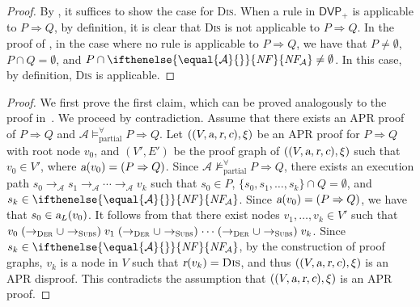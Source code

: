 \documentclass[10pt,a4paper]{article}
\def\cA{\mathcal{A}}
\newcommand{\NF}[1][]{\ifthenelse{\equal{#1}{}}{\mathit{NF}}{\mathit{NF\!}_{#1}}}
\newcommand{\ReachPred}[2]{#1 \Rightarrow #2}
\newcommand{\Valid}[3]{#2 \mathrel{\mathrel{\models^\forall_{\mathrm{#1}}}} #3}
\newcommand{\NotValid}[3]{#2 \mathrel{\mathrel{\not\models^\forall_{\mathrm{#1}}}} #3}
\newcommand{\PartiallyValid}[2][\cA]{\Valid{partial}{#1}{#2}}
\newcommand{\NotPartiallyValid}[2][\cA]{\NotValid{partial}{#1}{#2}}
\newcommand{\RuleName}[1]{{\rm \textsc{#1}}}
\newcommand{\DVPnew}[1][]{\mathsf{DVP}_+}
\newcommand{\varsl}[1]{\mbox{\sl #1}}
\newcommand{\Path}[1]{\to_{\mbox{\scriptsize \RuleName{#1}}}}
\newcommand{\toDer}{\Path{Der}}
\newcommand{\toSubs}{\Path{Subs}}
\begin{document}
\PropUniquenessOfApplicableRulesInCDVPnew*
\begin{proof}
	By , it suffices to show the case for \RuleName{Dis}.
	When a rule in $\DVPnew$ is applicable to $\ReachPred{P}{Q}$, by definition, it is clear that \RuleName{Dis} is not applicable to $\ReachPred{P}{Q}$.
	In the proof of , in the case where no rule is applicable to $\ReachPred{P}{Q}$, we have that $P \ne \emptyset$, $P \cap Q = \emptyset$, and $P \cap \NF[\cA] \ne \emptyset$.
	In this case, by definition, \RuleName{Dis} is applicable.
\end{proof}

\ThmSoundnessOfAPRProofs*
\begin{proof}
	We first prove the first claim, which can be proved analogously to the proof in~\cite[Theorem~3]{CL18}.
	We proceed by contradiction.
	Assume that there exists an APR proof of $\ReachPred{P}{Q}$ and
	$\PartiallyValid{\ReachPred{P}{Q}}$.
	Let $((V,\varsl{a},\varsl{r},\varsl{c}),\xi)$ be an APR proof for $\ReachPred{P}{Q}$ with root node $v_0$, and $(V',E')$ be the proof graph of $((V,\varsl{a},\varsl{r},\varsl{c}),\xi)$ such that $v_0 \in V'$,
	where $\varsl{a}(v_0) = (\ReachPred{P}{Q})$.
	Since
	$\NotPartiallyValid{\ReachPred{P}{Q}}$,
	there exists an execution path $s_0 \to_\cA s_1 \to_\cA \cdots \to_\cA v_k$ such that
	$s_0 \in P$, $\{s_0,s_1,\ldots,s_k\} \cap Q = \emptyset$, and $s_k \in \NF[\cA]$.
	Since $\varsl{a}(v_0) = (\ReachPred{P}{Q})$, we have that $s_0 \in \varsl{a}_L(v_0)$.
	It follows from  that
	there exist nodes $v_1,\ldots,v_k \in V'$ such that
	$v_0 \mathrel{(\toDer \cup \toSubs)}
		v_1 \mathrel{(\toDer \cup \toSubs)}
		\cdots
		\mathrel{(\toDer \cup \toSubs)}
		v_k$.
	Since $s_k \in \NF[\cA]$, by the construction of proof graphs, $v_k$ is a node in $V$ such that $\varsl{r}(v_k) = \mbox{\rm\RuleName{Dis}}$, and thus $((V,\varsl{a},\varsl{r},\varsl{c}),\xi)$ is an APR disproof.
	This contradicts the assumption that $((V,\varsl{a},\varsl{r},\varsl{c}),\xi)$ is an APR proof.


\end{proof}
\end{document}
